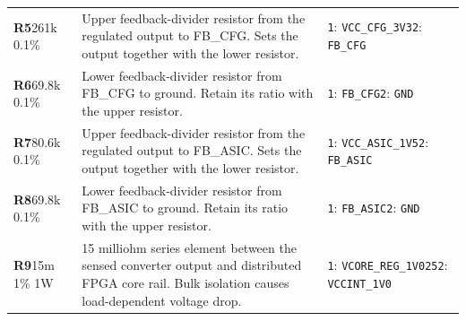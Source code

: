 \documentclass[11pt,a4paper]{article}
\begin{document}
\begin{longtable}{@{}P{27mm}P{84mm}P{57mm}@{}}
\textbf{R5}\newline 261k 0.1\% & Upper feedback-divider resistor from the regulated output to FB\_CFG. Sets the output together with the lower resistor. & \nolinkurl{1}: \nolinkurl{VCC_CFG_3V3}\newline \nolinkurl{2}: \nolinkurl{FB_CFG} \\
\textbf{R6}\newline 69.8k 0.1\% & Lower feedback-divider resistor from FB\_CFG to ground. Retain its ratio with the upper resistor. & \nolinkurl{1}: \nolinkurl{FB_CFG}\newline \nolinkurl{2}: \nolinkurl{GND} \\
\textbf{R7}\newline 80.6k 0.1\% & Upper feedback-divider resistor from the regulated output to FB\_ASIC. Sets the output together with the lower resistor. & \nolinkurl{1}: \nolinkurl{VCC_ASIC_1V5}\newline \nolinkurl{2}: \nolinkurl{FB_ASIC} \\
\textbf{R8}\newline 69.8k 0.1\% & Lower feedback-divider resistor from FB\_ASIC to ground. Retain its ratio with the upper resistor. & \nolinkurl{1}: \nolinkurl{FB_ASIC}\newline \nolinkurl{2}: \nolinkurl{GND} \\
\textbf{R9}\newline 15m 1\% 1W & 15 milliohm series element between the sensed converter output and distributed FPGA core rail. Bulk isolation causes load-dependent voltage drop. & \nolinkurl{1}: \nolinkurl{VCORE_REG_1V025}\newline \nolinkurl{2}: \nolinkurl{VCCINT_1V0} \\

\end{longtable}
\end{document}
